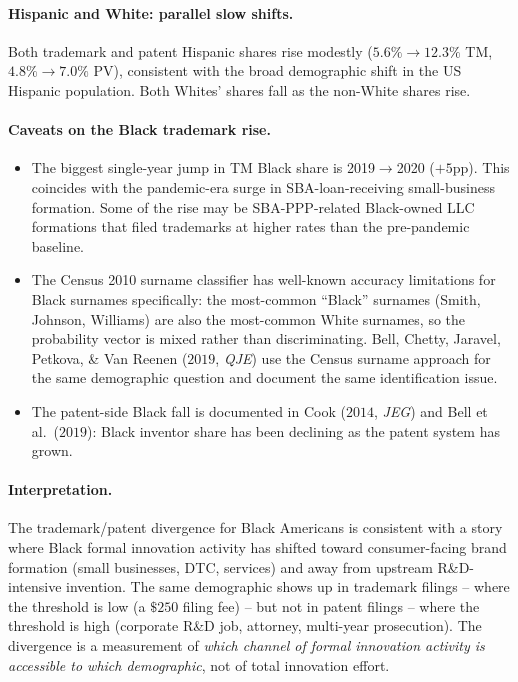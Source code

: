 \documentclass[11pt]{article}
\begin{document}
\paragraph{Hispanic and White: parallel slow shifts.} Both
trademark and patent Hispanic shares rise modestly ($5.6\% \to
12.3\%$ TM, $4.8\% \to 7.0\%$ PV), consistent with the broad
demographic shift in the US Hispanic population. Both Whites'
shares fall as the non-White shares rise.

\paragraph{Caveats on the Black trademark rise.}
\begin{itemize}\setlength\itemsep{2pt}
\item The biggest single-year jump in TM Black share is 2019$\to$2020
($+5$pp). This coincides with the pandemic-era surge in
SBA-loan-receiving small-business formation. Some of the rise may
be SBA-PPP-related Black-owned LLC formations that filed
trademarks at higher rates than the pre-pandemic baseline.
\item The Census 2010 surname classifier has well-known accuracy
limitations for Black surnames specifically: the most-common
``Black'' surnames (Smith, Johnson, Williams) are also the
most-common White surnames, so the probability vector is mixed
rather than discriminating. Bell, Chetty, Jaravel, Petkova, \&
Van Reenen ($2019$, \emph{QJE}) use the Census surname approach for
the same demographic question and document the same identification
issue.
\item The patent-side Black fall is documented in Cook
($2014$, \emph{JEG}) and Bell et al.\ ($2019$): Black inventor share
has been declining as the patent system has grown.
\end{itemize}

\paragraph{Interpretation.} The trademark/patent divergence for
Black Americans is consistent with a story where Black formal
innovation activity has shifted toward consumer-facing brand
formation (small businesses, DTC, services) and away from
upstream R\&D-intensive invention. The same demographic shows up in
trademark filings -- where the threshold is low (a $\$250$ filing
fee) -- but not in patent filings -- where the threshold is high
(corporate R\&D job, attorney, multi-year prosecution). The
divergence is a measurement of \emph{which channel of formal
innovation activity is accessible to which demographic}, not of
total innovation effort.
\end{document}

